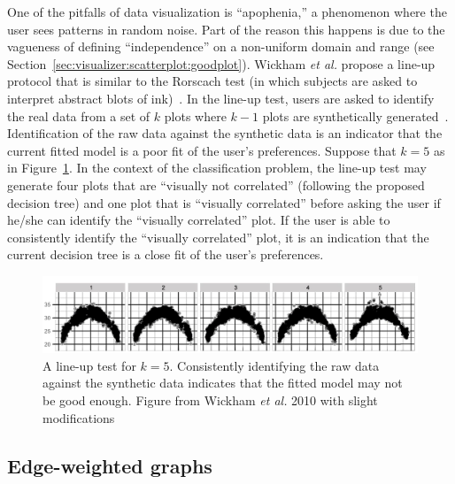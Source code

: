 One of the pitfalls of data visualization is ``apophenia,'' a phenomenon where
the user sees patterns in random noise. Part of the reason this happens is due 
to the vagueness of defining ``independence'' on a non-uniform domain and range
(see Section~\ref{sec:visualizer:scatterplot:goodplot}). Wickham \textit{et 
al.} propose a line-up protocol that is similar to the Rorscach test (in which 
subjects are asked to interpret abstract blots of ink)~\cite{wickham2010}. 
In the line-up test, users are asked to identify the real data from a set of 
$k$ plots where $k-1$ plots are synthetically generated~\cite{wickham2010}.
Identification of the raw data against the synthetic data is an indicator 
that the current fitted model is a poor fit of the user's preferences. Suppose 
that $k = 5$ as in Figure~\ref{fig:visualizer:lineup}.
In the context of the classification problem, the line-up test may generate
four plots that are ``visually not correlated'' (following the proposed 
decision tree) 
and one plot that is ``visually correlated'' before asking the user if he/she 
can 
identify the ``visually correlated'' plot. If the user is able to consistently 
identify the ``visually correlated'' plot, it is an indication that the current 
decision tree is a close fit of the user's preferences.

\tablespacing
\begin{figure}[H]
	\begin{center}
		\includegraphics[width=1\linewidth]{ch-conclusion/figures/lineup}
		\caption[A line-up test for $k = 5$. ]{A line-up test for $k = 5$.
			Consistently identifying the raw data against the synthetic data 
			indicates that the fitted model may not be good enough. Figure from 
			Wickham \textit{et al.} 2010 with slight 
			modifications~\cite{wickham2010}}
		\label{fig:visualizer:lineup}
	\end{center}
\end{figure}
\bodyspacing

\subsection{Edge-weighted graphs}
\label{sec:futurework:edgeweighted}

